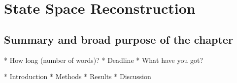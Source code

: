 
\chapter{State Space Reconstruction}

\ifpdf
    \graphicspath{{chapter3/figs/raster/}{chapter3/figs/PDF/}{chapter3/figs/}}
\else
    \graphicspath{{chapter3/figs/vector/}{chapter3/figs/}}
\fi

\section*{Summary and broad purpose of the chapter}
* How long (number of words)?
* Deadline
* What have you got?

* Introduction
* Methods
* Results
* Discussion
